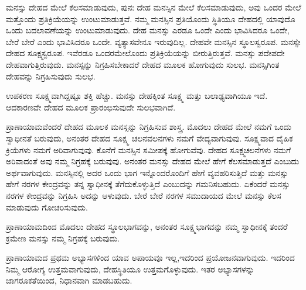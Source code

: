 ಮನಸ್ಸು ದೇಹದ ಮೇಲೆ ಕೆಲಸಮಾಡುವುದು, ಪುನಃ ದೇಹ ಮನಸ್ಸಿನ ಮೇಲೆ ಕೆಲಸಮಾಡುವುದು, ಅವು ಒಂದರ ಮೇಲೆ ಮತ್ತೊಂದು ಪ್ರತಿಕ್ರಿಯೆಯನ್ನು ಉಂಟುಮಾಡುತ್ತವೆ. ನಮ್ಮ ಮನಸ್ಸಿನ ಪ್ರತಿಯೊಂದು ಸ್ಥಿತಿಯೂ ದೇಹದಲ್ಲಿ ಯಾವುದೊ ಒಂದು ಬದಲಾವಣೆಯನ್ನು ಉಂಟುಮಾಡುವುದು. ದೇಹ ಮನಸ್ಸು ಎರಡೂ ಒಂದೇ ಎಂದು ಭಾವಿಸಿದರೂ ಒಂದೇ, ಬೇರೆ ಬೇರೆ ಎಂದು ಭಾವಿಸಿದರೂ ಒಂದೇ. ವ್ಯತ್ಯಾಸವೇನೂ ಇರುವುದಿಲ್ಲ. ದೇಹವೇ ಮನಸ್ಸಿನ ಸ್ಥೂಲಸ್ವರೂಪ. ಮನಸ್ಸೇ ದೇಹದ ಸೂಕ್ಷ್ಮಸ್ವರೂಪ. ಇವೆರಡೂ ಒಂದರಮೇಲೊಂದು ಪ್ರತಿಕ್ರಿಯೆಯನ್ನು ಬೀರುತ್ತಿರುತ್ತವೆ. ಮನಸ್ಸು ಪದೇಪದೇ ದೇಹವಾಗುತ್ತಿರುವುದು. ಮನಸ್ಸನ್ನು ನಿಗ್ರಹಿಸಬೇಕಾದರೆ ದೇಹದ ಮೂಲಕ ಹೋಗುವುದು ಸುಲಭ. ಮನಸ್ಸಿಗಿಂತ ದೇಹವನ್ನು ನಿಗ್ರಹಿಸುವುದು ಸುಲಭ.

ಉಪಕರಣ ಸೂಕ್ಷ್ಮವಾಗಿದ್ದಷ್ಟೂ ಶಕ್ತಿ ಹೆಚ್ಚು. ಮನಸ್ಸು ದೇಹಕ್ಕಿಂತ ಸೂಕ್ಷ್ಮ ಮತ್ತು ಬಲಾಢ್ಯವಾಗಿಯೂ ಇದೆ. ಆದಕಾರಣವೇ ದೇಹದ ಮೂಲಕ ಪ್ರಾರಂಭಿಸುವುದೇ ಸುಲಭವಾಗಿದೆ.

ಪ್ರಾಣಾಯಾಮವೆಂದರೆ ದೇಹದ ಮೂಲಕ ಮನಸ್ಸನ್ನು ನಿಗ್ರಹಿಸುವ ಶಾಸ್ತ್ರ. ಮೊದಲು ದೇಹದ ಮೇಲೆ ನಮಗೆ ಒಂದು ಸ್ವಾಧೀನತೆ ಬರುವುದು, ಅನಂತರ ದೇಹದ ಸೂಕ್ಷ್ಮ ಚಲನವಲನಗಳು ನಮಗೆ ವೇದ್ಯವಾಗುವುವು. ಸೂಕ್ಷ್ಮವಾದ ದೈಹಿಕ ಕ್ರಿಯೆಗಳು ನಮಗೆ ಅರಿವಾಗುವುವು. ಕೊನೆಗೆ ಮನಸ್ಸಿನ ಸಮೀಪಕ್ಕೆ ಹೋಗುವೆವು. ದೇಹದ ಸೂಕ್ಷ್ಮಚಲನೆಗಳು ನಮಗೆ ಅರಿವಾದಂತೆ ಅವು ನಮ್ಮ ನಿಗ್ರಹಕ್ಕೆ ಬರುವುವು. ಅನಂತರ ಮನಸ್ಸು ದೇಹದ ಮೇಲೆ ಹೇಗೆ ಕೆಲಸಮಾಡುತ್ತದೆ ಎಂಬುದು ಅರ್ಥವಾಗುವುದು. ಮನಸ್ಸಿನಲ್ಲಿ ಅದರ ಒಂದು ಭಾಗ ಇನ್ನೊಂದರೊಂದಿಗೆ ಹೇಗೆ ವ್ಯವಹರಿಸುತ್ತಿದೆ ಮತ್ತು ಮನಸ್ಸು ಹೇಗೆ ನರಗಳ ಕೇಂದ್ರವನ್ನು ತನ್ನ ಸ್ವಾಧೀನಕ್ಕೆ ತೆಗೆದುಕೊಳ್ಳುತ್ತಿದೆ ಎಂಬುದನ್ನು ಗಮನಿಸಬಹುದು. ಏಕೆಂದರೆ ಮನಸ್ಸು ನರಗಳ ಕೇಂದ್ರವನ್ನು ನಿಗ್ರಹಿಸಿ ಅದನ್ನು ಆಳುವುದು. ಬೇರೆ ಬೇರೆ ನರಗಳ ಸಮುದಾಯದ ಮೇಲೆ ಮನಸ್ಸು ಕೆಲಸ ಮಾಡುವುದು ಗೋಚರಿಸುವುದು.

ಪ್ರಾಣಾಯಾಮದಿಂದ ಮೊದಲು ದೇಹದ ಸ್ಥೂಲಭಾಗವನ್ನು, ಅನಂತರ ಸೂಕ್ಷ್ಮಭಾಗವನ್ನು ನಮ್ಮ ಸ್ವಾಧೀನಕ್ಕೆ ತಂದರೆ ಕ್ರಮೇಣ ಮನಸ್ಸು ನಮ್ಮ ನಿಗ್ರಹಕ್ಕೆ ಬರುವುದು.

ಪ್ರಾಣಾಯಾಮದ ಪ್ರಥಮ ಅಭ್ಯಾಸಗಳಿಂದ ಯಾವ ಅಪಾಯವೂ ಇಲ್ಲ,\break ಇದರಿಂದ ಪ್ರಯೋಜನವಾಗುವುದು. ಇದರಿಂದ ನಿಮ್ಮ ಆರೋಗ್ಯ ಉತ್ತಮವಾಗುವುದು, ದೇಹಸ್ಥಿತಿಯೂ ಉತ್ತಮಗೊಳ್ಳುವುದು. ಇತರ ಅಭ್ಯಾಸಗಳನ್ನು ಜಾಗರೂಕತೆಯಿಂದ, ನಿಧಾನವಾಗಿ ಮಾಡಬಹುದು.

